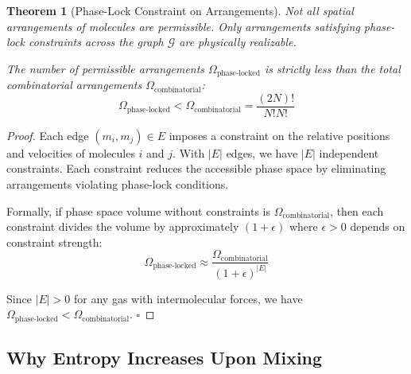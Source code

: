 \documentclass[12pt,a4paper]{article}
\newtheorem{theorem}{Theorem}[section]
\theoremstyle{remark}
\begin{document}
\begin{theorem}[Phase-Lock Constraint on Arrangements]
\label{thm:phase_lock_constraint}
Not all spatial arrangements of molecules are permissible. Only arrangements satisfying phase-lock constraints across the graph $\mathcal{G}$ are physically realizable.

The number of permissible arrangements $\Omega_{\text{phase-locked}}$ is strictly less than the total combinatorial arrangements $\Omega_{\text{combinatorial}}$:
\begin{equation}
\Omega_{\text{phase-locked}} < \Omega_{\text{combinatorial}} = \frac{(2N)!}{N! N!}
\end{equation}
\end{theorem}

\begin{proof}
Each edge $(m_i, m_j) \in E$ imposes a constraint on the relative positions and velocities of molecules $i$ and $j$. With $|E|$ edges, we have $|E|$ independent constraints. Each constraint reduces the accessible phase space by eliminating arrangements violating phase-lock conditions.

Formally, if phase space volume without constraints is $\Omega_{\text{combinatorial}}$, then each constraint divides the volume by approximately $(1 + \epsilon)$ where $\epsilon > 0$ depends on constraint strength:
\begin{equation}
\Omega_{\text{phase-locked}} \approx \frac{\Omega_{\text{combinatorial}}}{(1 + \epsilon)^{|E|}}
\end{equation}

Since $|E| > 0$ for any gas with intermolecular forces, we have $\Omega_{\text{phase-locked}} < \Omega_{\text{combinatorial}}$. $\square$
\end{proof}

\subsection{Why Entropy Increases Upon Mixing}
\end{document}
